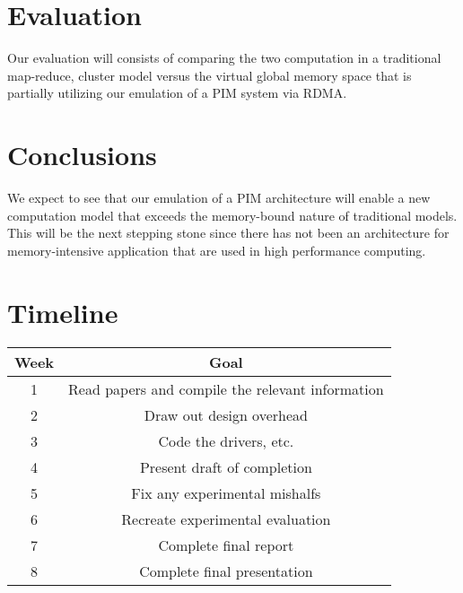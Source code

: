 \documentclass[12pt]{article}
\begin{document}
\section{Evaluation}
Our evaluation will consists of comparing the two computation in a traditional map-reduce, cluster model versus the virtual global memory space that is partially utilizing our emulation of a PIM system via RDMA.

\section{Conclusions}
We expect to see that our emulation of a PIM architecture will enable a new computation model that exceeds the memory-bound nature of traditional models. This will be the next stepping stone since there has not been an architecture for memory-intensive application that are used in high performance computing.

\section{Timeline}

\begin{center}
\begin{tabular}{ |c|c| } 
 \hline
 Week & Goal \\ 
 \hline 
 1 & Read papers and compile the relevant information \\ 
 \hline
 2 & Draw out design overhead \\
 \hline
 3 & Code the drivers, etc. \\
 \hline
 4 & Present draft of completion \\ \hline 5 & Fix any experimental mishalfs \\ \hline 6 & Recreate experimental evaluation \\ \hline 
 7 & Complete final report \\ \hline 8 &  Complete final presentation \\
 \hline
\end{tabular}
\end{center}

\newpage 

\nocite{*}

\printbibliography
\end{document}
